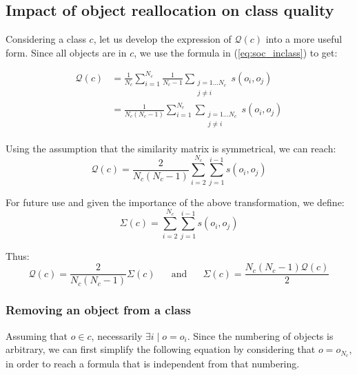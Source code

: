 \documentclass[natbib,smallextended]{svjour3}
\begin{document}
\subsection{Impact of object reallocation on class quality}

Considering a class $c$, let us develop the expression of $\mathcal{Q}(c)$ into a more useful form. Since all objects are in $c$, we use the formula in (\ref{eq:soc_inclass}) to get:

\begin{equation*}
  \begin{aligned}
    \mathcal{Q}\left(c\right) & = \frac{1}{N_c} \sum_{i=1}^{N_c} \frac{1}{N_c-1} \sum_{\substack{j=1 \ldots N_c\\j \neq i}} s\left(o_i, o_j\right) \\
                              & = \frac{1}{N_c(N_c-1)} \sum_{i=1}^{N_c} \sum_{\substack{j=1 \ldots N_c\\j \neq i}} s\left(o_i, o_j\right)
  \end{aligned}
\end{equation*}

Using the assumption that the similarity matrix is symmetrical, we can reach: %
\begin{equation}
    \mathcal{Q}\left(c\right) = \frac{2}{N_c(N_c-1)} \sum_{i=2}^{N_c} \sum_{j=1}^{i-1} s\left(o_i, o_j\right)
    \label{eq:classQuality}
\end{equation}

For future use and given the importance of the above transformation, we define:
\[
  \Sigma(c) = \sum_{i=2}^{N_c} \sum_{j=1}^{i-1} s\left(o_i, o_j\right)
\]

Thus:
\[
\mathcal{Q}\left(c\right) = \frac{2}{N_c(N_c-1)}\Sigma(c) \phantom{XX}\mathrm{and}\phantom{XX} \Sigma(c) = \frac{N_c(N_c-1)\mathcal{Q}\left(c\right)}{2}
\]

\subsubsection{Removing an object from a class}

Assuming that $o \in c$, necessarily $\exists i \mid o=o_i$. Since the numbering of objects is arbitrary, we can first simplify the following equation by considering that $o = o_{N_c}$, in order to reach a formula that is independent from that numbering.
\end{document}
